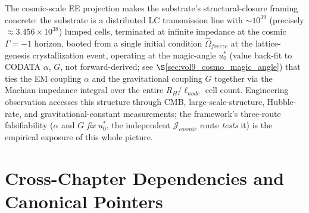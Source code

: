 \noindent
The cosmic-scale EE projection makes the substrate's structural-closure framing concrete: the substrate is a distributed LC transmission line with $\sim 10^{39}$ (precisely $\approx 3.456\times10^{38}$) lumped cells, terminated at infinite impedance at the cosmic $\Gamma = -1$\gammaundeclared{} horizon, booted from a single initial condition $\hat{\Omega}_{freeze}$ at the lattice-genesis crystallization event, operating at the magic-angle $u_0^*$ (value back-fit to CODATA $\alpha$, $G$, not forward-derived; see $\S$\ref{sec:vol9_cosmo_magic_angle}) that ties the EM coupling $\alpha$ and the gravitational coupling $G$ together via the Machian impedance integral over the entire $R_H/\ell_{node}$ cell count. Engineering observation accesses this structure through CMB, large-scale-structure, Hubble-rate, and gravitational-constant measurements; the framework's three-route falsifiability ($\alpha$ and $G$ \emph{fix} $u_0^*$, the independent $\mathcal{J}_{cosmic}$ route \emph{tests} it) is the empirical exposure of this whole picture.

\section{Cross-Chapter Dependencies and Canonical Pointers}
\label{sec:vol9_cosmo_xchapter_pointers}

